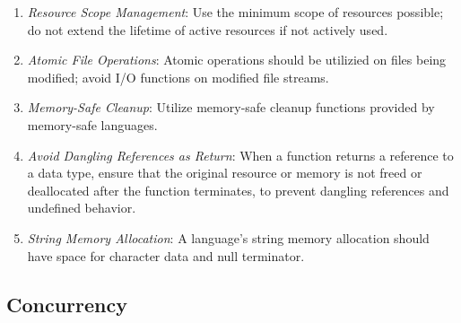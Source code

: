 \documentclass[9pt]{IEEEtran} %
\begin{document}
\begin{enumerate}
  \item \textit{Resource Scope Management}: Use the minimum scope of resources possible; do not extend the lifetime of active resources if not actively used.
  \item \textit{Atomic File Operations}: Atomic operations should be utilizied on files being modified; avoid I/O functions on modified file streams.
  \item \textit{Memory-Safe Cleanup}: Utilize memory-safe cleanup functions provided by memory-safe languages. 
  \item \textit{Avoid Dangling References as Return}: When a function returns a reference to a data type, ensure that the original resource or memory is not freed or deallocated after the function terminates, to prevent dangling references and undefined behavior.
  \item \textit{String Memory Allocation}: A language's string memory allocation should have space for character data and null terminator.
\end{enumerate}

\subsection{Concurrency}
\label{ESSConcurrency}
\end{document}
